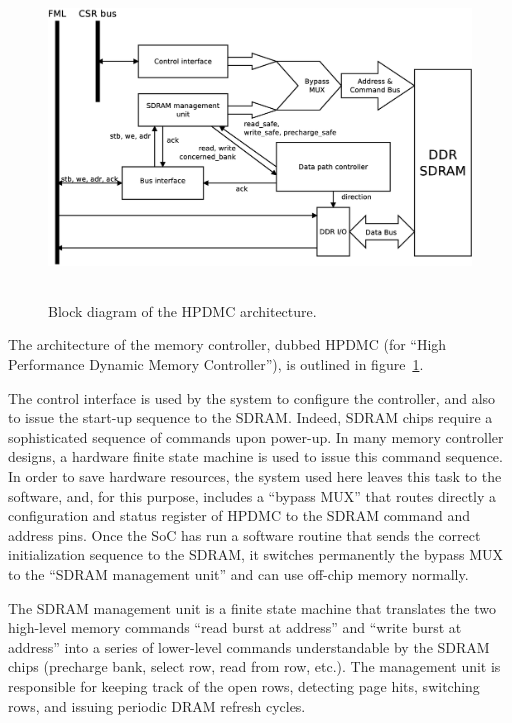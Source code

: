 \documentclass[a4paper,11pt]{kthesis}
\begin{document}
\begin{figure}[H]
\centering
\includegraphics[height=85mm]{hpdmc_block.eps}
\caption{Block diagram of the HPDMC architecture.}\label{fig:hpdmc_block}
\end{figure}

The architecture of the memory controller, dubbed HPDMC (for ``High Performance Dynamic Memory Controller''), is outlined in figure~\ref{fig:hpdmc_block}.

The control interface is used by the system to configure the controller, and also to issue the start-up sequence to the SDRAM. Indeed, SDRAM chips require a sophisticated sequence of commands upon power-up. In many memory controller designs, a hardware finite state machine is used to issue this command sequence. In order to save hardware resources, the system used  here leaves this task to the software, and, for this purpose, includes a ``bypass MUX'' that routes directly a configuration and status register of HPDMC to the SDRAM command and address pins. Once the SoC has run a software routine that sends the correct initialization sequence to the SDRAM, it switches permanently the bypass MUX to the ``SDRAM management unit'' and can use off-chip memory normally.

The SDRAM management unit is a finite state machine that translates the two high-level memory commands ``read burst at address'' and ``write burst at address'' into a series of lower-level commands understandable by the SDRAM chips (precharge bank, select row, read from row, etc.). The management unit is responsible for keeping track of the open rows, detecting page hits, switching rows, and issuing periodic DRAM refresh cycles.
\end{document}
